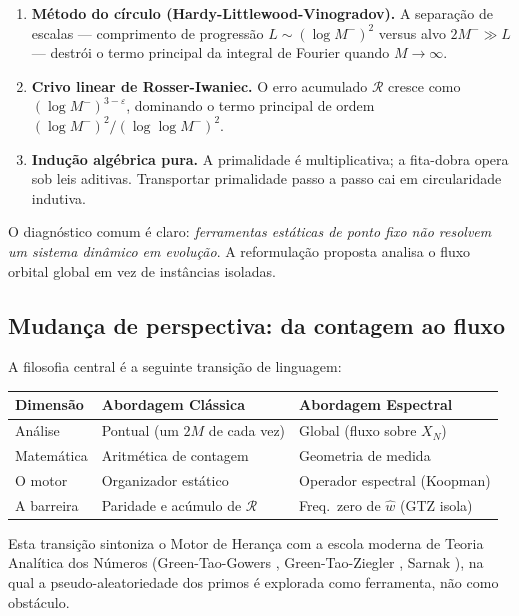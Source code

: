 \documentclass[12pt,a4paper]{article}
\theoremstyle{definition}
\begin{document}
	\begin{enumerate}[label=(\roman*)]
		\item \textbf{Método do círculo (Hardy-Littlewood-Vinogradov).} A
		separação de escalas — comprimento de progressão $L \sim (\log M^-)^2$
		versus alvo $2M^- \gg L$ — destrói o termo principal da integral de
		Fourier quando $M \to \infty$.
		
		\item \textbf{Crivo linear de Rosser-Iwaniec.} O erro acumulado
		$\mathcal{R}$ cresce como $(\log M^-)^{3-\varepsilon}$, dominando o
		termo principal de ordem $(\log M^-)^2 / (\log\log M^-)^2$.
		
		\item \textbf{Indução algébrica pura.} A primalidade é multiplicativa;
		a fita-dobra opera sob leis aditivas. Transportar primalidade passo a
		passo cai em circularidade indutiva.
	\end{enumerate}
	
	O diagnóstico comum é claro: \emph{ferramentas estáticas de ponto fixo não
		resolvem um sistema dinâmico em evolução}. A reformulação proposta analisa
	o fluxo orbital global em vez de instâncias isoladas.
	
	\subsection{Mudança de perspectiva: da contagem ao fluxo}
	
	A filosofia central é a seguinte transição de linguagem:
	
	\begin{center}
		\renewcommand{\arraystretch}{1.4}
		\begin{tabular}{lll}
			\toprule
			\textbf{Dimensão} & \textbf{Abordagem Clássica} & \textbf{Abordagem Espectral} \\
			\midrule
			Análise & Pontual (um $2M$ de cada vez) & Global (fluxo sobre $X_N$) \\
			Matemática & Aritmética de contagem & Geometria de medida \\
			O motor & Organizador estático & Operador espectral (Koopman) \\
			A barreira & Paridade e acúmulo de $\mathcal{R}$ & Freq.\ zero de $\widehat{w}$ (GTZ isola) \\
			\bottomrule
		\end{tabular}
	\end{center}
	
	Esta transição sintoniza o Motor de Herança com a escola moderna de
	Teoria Analítica dos Números (Green-Tao-Gowers \cite{greentao},
	Green-Tao-Ziegler \cite{greentaoziegler}, Sarnak \cite{sarnak}),
	na qual a pseudo-aleatoriedade dos primos é explorada como ferramenta,
	não como obstáculo.
	
\end{document}
